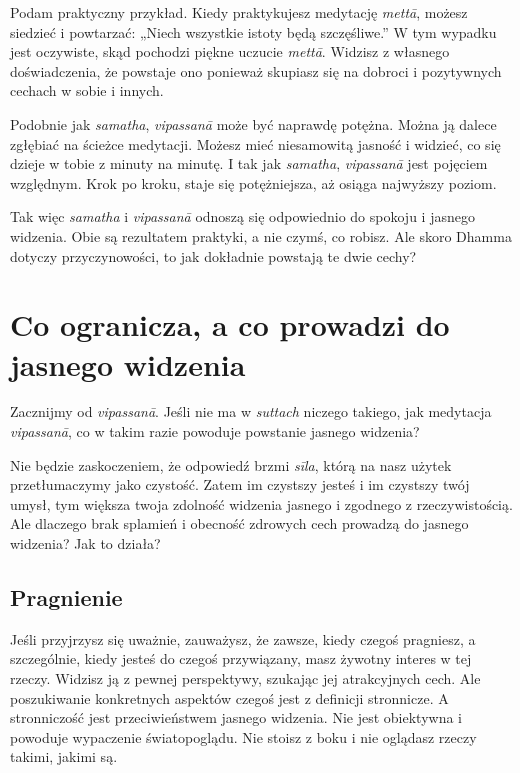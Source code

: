 \documentclass[12pt,openany]{book}
\begin{document}
Podam praktyczny przykład. Kiedy praktykujesz medytację \textit{mettā}, możesz siedzieć i powtarzać: „Niech wszystkie istoty będą szczęśliwe.” W tym wypadku jest oczywiste, skąd pochodzi piękne uczucie \textit{mettā}. Widzisz z własnego doświadczenia, że powstaje ono ponieważ skupiasz się na dobroci i pozytywnych cechach w sobie i innych.

Podobnie jak \textit{samatha}, \textit{vipassanā} może być naprawdę potężna. Można ją dalece zgłębiać na ścieżce medytacji. Możesz mieć niesamowitą jasność i widzieć, co się dzieje w tobie z minuty na minutę. I tak jak  \textit{samatha}, \textit{vipassanā} jest pojęciem względnym. Krok po kroku, staje się potężniejsza, aż osiąga najwyższy poziom.

Tak więc \textit{samatha} i \textit{vipassanā} odnoszą się odpowiednio do spokoju i jasnego widzenia. Obie są rezultatem praktyki, a nie czymś, co robisz. Ale skoro Dhamma dotyczy przyczynowości, to jak dokładnie powstają te dwie cechy?

\chapter*{Co ogranicza, a co prowadzi do jasnego widzenia}

Zacznijmy od \textit{vipassanā}. Jeśli nie ma w \textit{suttach} niczego takiego, jak medytacja  \textit{vipassanā}, co w takim razie powoduje powstanie jasnego widzenia?

Nie będzie zaskoczeniem, że odpowiedź brzmi \textit{sīla}, którą na nasz użytek przetłumaczymy jako czystość. Zatem im czystszy jesteś i im czystszy twój umysł, tym większa twoja zdolność widzenia jasnego i zgodnego z rzeczywistością. Ale dlaczego brak splamień i obecność zdrowych cech prowadzą do jasnego widzenia? Jak to działa?

\section*{Pragnienie}

Jeśli przyjrzysz się uważnie, zauważysz, że zawsze, kiedy czegoś pragniesz, a szczególnie, kiedy jesteś do czegoś przywiązany, masz żywotny interes w tej rzeczy. Widzisz ją z pewnej perspektywy, szukając jej atrakcyjnych cech. Ale poszukiwanie konkretnych aspektów czegoś jest z definicji stronnicze. A stronniczość jest przeciwieństwem jasnego widzenia. Nie jest obiektywna i powoduje wypaczenie światopoglądu. Nie stoisz z boku i nie oglądasz rzeczy takimi, jakimi są.
\end{document}

